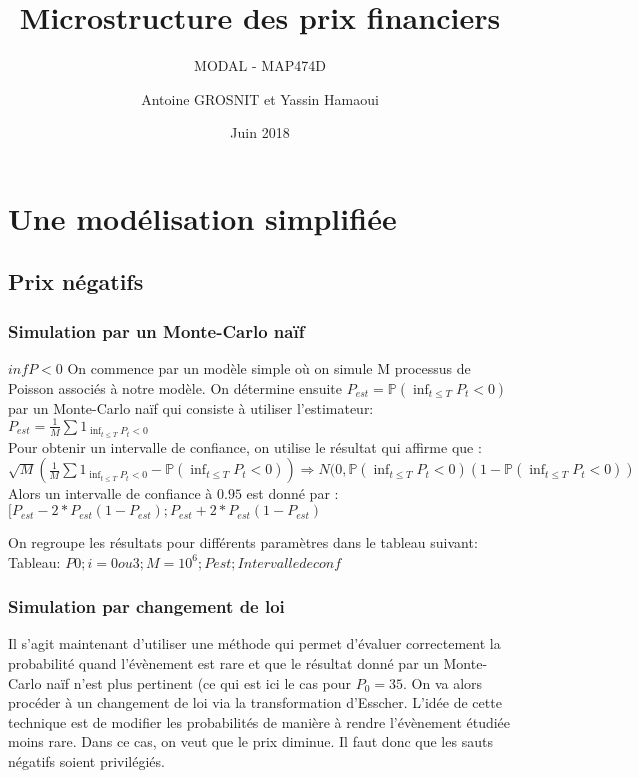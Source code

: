 \documentclass[a4paper,11pt]{article}
\title{Microstructure des prix financiers}
\author{Antoine GROSNIT et Yassin Hamaoui}
\subtitle{MODAL - MAP474D}
\date{Juin 2018}
\begin{document}
\maketitle
\section{Une modélisation simplifiée}

\subsection{Prix négatifs}

\subsubsection{Simulation par un Monte-Carlo naïf}

$inf P<0$
On commence par un modèle simple où on simule M processus de Poisson associés à notre modèle. On détermine ensuite $P_{est}=\mathbb{P}(\inf_{t\leq T} P_{t}< 0)$ par un Monte-Carlo naïf qui consiste à utiliser l'estimateur: $P_{est}=\frac{1}{M}\sum 1_{ \inf_{t\leq T} P_{t}< 0}$ \\

Pour obtenir un intervalle de confiance, on utilise le résultat qui affirme que : 
$\sqrt{M}(\frac{1}{M}\sum 1_{ \inf_{t\leq T} P_{t}< 0}-\mathbb{P}(\inf_{t\leq T} P_{t}< 0)) \Rightarrow N(0,\mathbb{P}(\inf_{t\leq T} P_{t}< 0)(1-\mathbb{P}(\inf_{t\leq T} P_{t}< 0))$ \\

Alors un intervalle de confiance à $0.95$ est donné par : $[P_{est}-2*P_{est}(1-P_{est});P_{est}+2*P_{est}(1-P_{est})$ 


On regroupe les résultats pour différents paramètres dans le tableau suivant: \\
Tableau: $P0; i=0 ou 3 ;M=10^6; Pest; Intervalle de conf$



\subsubsection{Simulation par changement de loi}

Il s'agit maintenant d'utiliser une méthode qui permet d'évaluer correctement la probabilité quand l'évènement est rare et que le résultat donné par un Monte-Carlo naïf n'est plus pertinent (ce qui est ici le cas pour $P_{0}=35$. On va alors procéder à un changement de loi via la transformation d'Esscher. L'idée de cette technique est de modifier les probabilités de manière à rendre l'évènement étudiée moins rare. Dans ce cas, on veut que le prix diminue. Il faut donc que les sauts négatifs soient privilégiés. 
\end{document}

